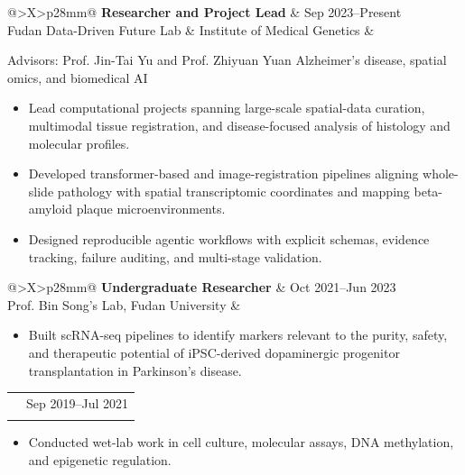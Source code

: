 \documentclass[10pt,a4paper]{article}
\makeatletter
\newcommand{\pubmeta}[1]{{\fontsize{8.35}{9.85}\selectfont\color{Muted}\RaggedRight #1}}
\newcommand{\roleline}[3]{%
  \begin{tabularx}{\linewidth}{@{}>{\RaggedRight\arraybackslash}X>{\RaggedLeft\arraybackslash}p{28mm}@{}}
    {\fontsize{9.35}{10.55}\selectfont\bfseries #1} & {\fontsize{8.25}{9.45}\selectfont\color{Muted}#3}\\[-0.12em]
    {\fontsize{8.6}{9.85}\selectfont\color{Teal}#2} &
  \end{tabularx}
}
\newcommand{\cvitem}[1]{\item {\fontsize{8.65}{10.25}\selectfont\RaggedRight #1}}
\newenvironment{cvitems}{%
  \begin{itemize}[leftmargin=1.08em,itemsep=0.10em,topsep=0.20em,parsep=0pt,partopsep=0pt,label=\textcolor{Teal}{\raisebox{0.14ex}{\tiny\textbullet}}]
}{\end{itemize}}
\makeatother
\begin{document}
\begin{minipage}[t]{0.650\textwidth}
\roleline{Researcher and Project Lead}{Fudan Data-Driven Future Lab \& Institute of Medical Genetics}{Sep 2023--Present}
\pubmeta{Advisors: Prof. Jin-Tai Yu and Prof. Zhiyuan Yuan \textbar{} Alzheimer's disease, spatial omics, and biomedical AI}\par
\begin{cvitems}
  \cvitem{Lead computational projects spanning large-scale spatial-data curation, multimodal tissue registration, and disease-focused analysis of histology and molecular profiles.}
  \cvitem{Developed transformer-based and image-registration pipelines aligning whole-slide pathology with spatial transcriptomic coordinates and mapping beta-amyloid plaque microenvironments.}
  \cvitem{Designed reproducible agentic workflows with explicit schemas, evidence tracking, failure auditing, and multi-stage validation.}
\end{cvitems}

\vspace{0.18em}
\roleline{Undergraduate Researcher}{Prof. Bin Song's Lab, Fudan University}{Oct 2021--Jun 2023}
\begin{cvitems}
  \cvitem{Built scRNA-seq pipelines to identify markers relevant to the purity, safety, and therapeutic potential of iPSC-derived dopaminergic progenitor transplantation in Parkinson's disease.}
\end{cvitems}

\vspace{0.15em}
\roleline{Undergraduate Researcher}{Prof. Fei Lan's Lab, Institutes of Biomedical Sciences}{Sep 2019--Jul 2021}
\begin{cvitems}
  \cvitem{Conducted wet-lab work in cell culture, molecular assays, DNA methylation, and epigenetic regulation.}
\end{cvitems}

\end{minipage}
\end{document}
